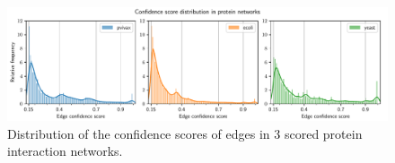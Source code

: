 \begin{figure}
    \includegraphics[width=\linewidth]{histogram_edges.pdf}
    \vspace*{-0.6cm}
    \caption{Distribution of the confidence scores of edges in 3 scored protein interaction networks.}
    \label{fig:histogram_edges}
\end{figure}
